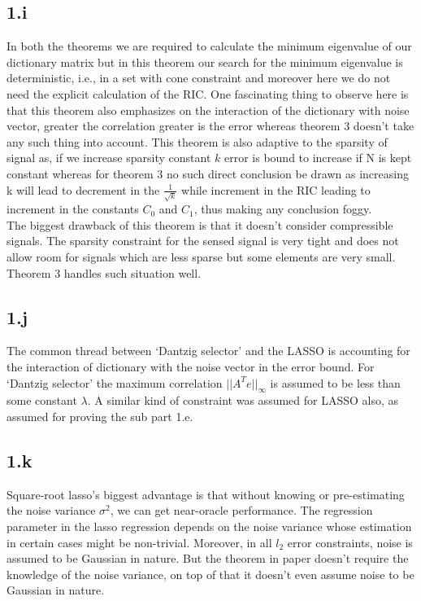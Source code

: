 \documentclass[12pt]{article}
\begin{document}
\subsection*{1.i}
In both the theorems we are required to calculate the minimum eigenvalue of our dictionary matrix but in this theorem our search for the minimum eigenvalue is deterministic, i.e.,   in a set with cone constraint and moreover here we do not need the explicit calculation of the RIC. One fascinating thing to observe here is that this theorem also emphasizes on the interaction of the dictionary with noise vector, greater the correlation greater is the error whereas theorem 3 doesn't take any such thing into account. This theorem is also adaptive to the sparsity of signal as, if we increase sparsity constant $k$ error is bound to increase if N is kept constant whereas for theorem 3 no such direct conclusion be drawn as increasing k will lead to decrement in the $\frac{1}{\sqrt{k}}$ while increment in the RIC leading to increment in the constants $C_0$ and $C_1$, thus making any conclusion foggy.\\
The biggest drawback of this theorem is that it doesn't consider compressible signals. The sparsity constraint for the sensed signal is very tight and does not allow room for signals which are less sparse but some elements are very small. Theorem 3 handles such situation well. 
\subsection*{1.j}
The common thread between `Dantzig selector' and the LASSO is accounting for the interaction of dictionary with the noise vector in the error bound. For `Dantzig selector' the maximum correlation $||A^Te||_{\infty}$ is assumed to be less than some constant $\lambda$. A similar kind of constraint was assumed for LASSO also, as assumed for proving the sub part 1.e. 
\subsection*{1.k}
Square-root lasso's biggest advantage is that without knowing or pre-estimating the noise variance $\sigma^2$, we can get near-oracle performance. The regression parameter in the lasso regression depends on the noise variance whose estimation in certain cases might be non-trivial. Moreover, in all $l_2$ error constraints, noise is assumed to be Gaussian in nature. But the theorem in paper doesn't require the knowledge of the noise variance, on top of that it doesn't even assume noise to be Gaussian in nature.
\end{document}
